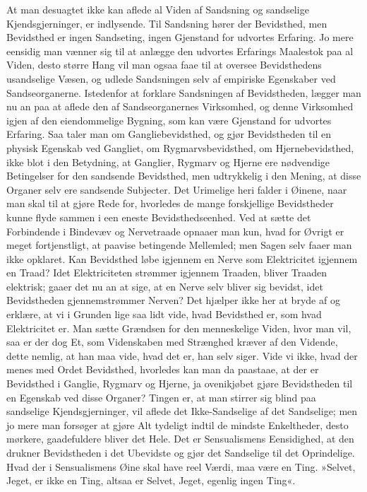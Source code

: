 \documentclass[12pt]{book}
\newcommand{\apage}[1]{\marginnote{\footnotesize\textit{[#1]}}}
\begin{document}
\apage{14} At man desuagtet ikke kan aflede al Viden af Sandsning og sandselige
Kjendsgjerninger, er indlysende. Til Sandsning hører der Bevidsthed, men
Bevidsthed er ingen Sandseting, ingen Gjenstand for udvortes Erfaring. Jo
mere eensidig man vænner sig til at anlægge den udvortes Erfarings
Maalestok paa al Viden, desto større Hang vil man ogsaa faae til at
oversee Bevidsthedens usandselige Væsen, og udlede Sandsningen selv af
empiriske Egenskaber ved Sandseorganerne. Istedenfor at forklare
Sandsningen af Bevidstheden, lægger man nu an paa at aflede den af
Sandseorganernes Virksomhed, og denne Virksomhed igjen af den
eiendommelige Bygning, som kan være Gjenstand for udvortes Erfaring. Saa
taler man om Gangliebevidsthed, og gjør Bevidstheden til en physisk
Egenskab ved Gangliet, om Rygmarvsbevidsthed, om Hjernebevidsthed, ikke
blot i den Betydning, at Ganglier, Rygmarv og Hjerne ere nødvendige
Betingelser for den sandsende Bevidsthed, men udtrykkelig i den Mening, at
disse Organer selv ere sandsende Subjecter. Det Urimelige heri falder i
Øinene, naar man skal til at gjøre Rede for, hvorledes de mange
forskjellige Bevidstheder kunne flyde sammen i een eneste
Bevidsthedseenhed. Ved at sætte det Forbindende i Bindevæv og Nervetraade
opnaaer man kun, hvad for Øvrigt er meget fortjenstligt, at paavise
betingende Mellemled; men Sagen selv faaer man ikke opklaret. Kan
Bevidsthed løbe igjennem en Nerve som Elektricitet igjennem en Traad? Idet
Elektriciteten strømmer igjennem Traaden, bliver Traaden elektrisk; gaaer
det nu an at sige, at en Nerve selv \apage{15} bliver sig bevidst, idet Bevidstheden
gjennemstrømmer Nerven? Det hjælper ikke her at bryde af og erklære, at vi
i Grunden lige saa lidt vide, hvad Bevidsthed er, som hvad Elektricitet
er. Man sætte Grændsen for den menneskelige Viden, hvor man vil, saa er
der dog Et, som Videnskaben med Strænghed kræver af den Vidende, dette
nemlig, at han maa vide, hvad det er, han selv siger. Vide vi ikke, hvad
der menes med Ordet Bevidsthed, hvorledes kan man da paastaae, at der er
Bevidsthed i Ganglie, Rygmarv og Hjerne, ja ovenikjøbet gjøre
Bevidstheden til en Egenskab ved disse Organer? Tingen er, at man stirrer
sig blind paa sandselige Kjendsgjerninger, vil aflede det Ikke-Sandselige
af det Sandselige; men jo mere man forsøger at gjøre Alt tydeligt indtil
de mindste Enkeltheder, desto mørkere, gaadefuldere bliver det Hele. Det
er Sensualismens Eensidighed, at den drukner Bevidstheden i det Ubevidste
og gjør det Sandselige til det Oprindelige. Hvad der i Sensualismens Øine
skal have reel Værdi, maa være en Ting. »Selvet, Jeget, er ikke en Ting,
altsaa er Selvet, Jeget, egenlig ingen Ting«.
\end{document}
